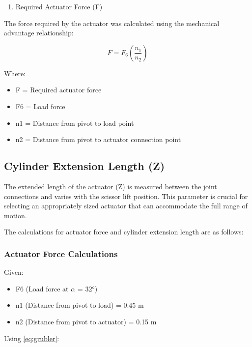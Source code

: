 \documentclass[../../main]{subfiles}
\begin{document}
\begin{enumerate}
\def\labelenumi{\arabic{enumi}.}
\item
  Required Actuator Force (F)
\end{enumerate}

The force required by the actuator was calculated using the mechanical
advantage relationship:

\begin{equation}
  F = F_6 \left(\frac{n_1}{n_2}\right)
\end{equation}

Where:

\begin{itemize}
\item
  F = Required actuator force
\item
  F6 = Load force
\item
  n1 = Distance from pivot to load point
\item
  n2 = Distance from pivot to actuator connection point
\end{itemize}



\subsection{Cylinder Extension Length (Z)}


The extended length of the actuator (Z) is measured between the joint
connections and varies with the scissor lift position. This parameter is
crucial for selecting an appropriately sized actuator that can
accommodate the full range of motion.

The calculations for actuator force and cylinder extension length are as
follows:

\subsubsection{Actuator Force Calculations}

Given:

\begin{itemize}
\item
  F6 (Load force at $\alpha$ = 32°)
\item
  n1 (Distance from pivot to load) = 0.45 m
\item
  n2 (Distance from pivot to actuator) = 0.15 m
\end{itemize}

Using \cref{eq:grubler}:
\end{document}
